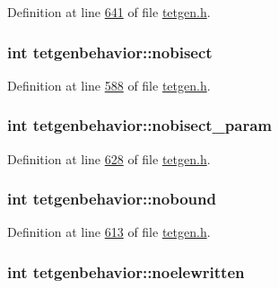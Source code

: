 Definition at line \hyperlink{tetgen_8h_source_l00641}{641} of file \hyperlink{tetgen_8h_source}{tetgen.\+h}.

\subsubsection[{\texorpdfstring{nobisect}{nobisect}}]{\setlength{\rightskip}{0pt plus 5cm}int tetgenbehavior\+::nobisect}\hypertarget{classtetgenbehavior_a14b1ffe9dae2e1849d22739d2ef3ba20}{}\label{classtetgenbehavior_a14b1ffe9dae2e1849d22739d2ef3ba20}


Definition at line \hyperlink{tetgen_8h_source_l00588}{588} of file \hyperlink{tetgen_8h_source}{tetgen.\+h}.

\subsubsection[{\texorpdfstring{nobisect\+\_\+param}{nobisect_param}}]{\setlength{\rightskip}{0pt plus 5cm}int tetgenbehavior\+::nobisect\+\_\+param}\hypertarget{classtetgenbehavior_a6a331aa8b36d3f8dfee8b7fd8102520a}{}\label{classtetgenbehavior_a6a331aa8b36d3f8dfee8b7fd8102520a}


Definition at line \hyperlink{tetgen_8h_source_l00628}{628} of file \hyperlink{tetgen_8h_source}{tetgen.\+h}.

\subsubsection[{\texorpdfstring{nobound}{nobound}}]{\setlength{\rightskip}{0pt plus 5cm}int tetgenbehavior\+::nobound}\hypertarget{classtetgenbehavior_a1e2af153b5b7a271191e021c518f3d83}{}\label{classtetgenbehavior_a1e2af153b5b7a271191e021c518f3d83}


Definition at line \hyperlink{tetgen_8h_source_l00613}{613} of file \hyperlink{tetgen_8h_source}{tetgen.\+h}.

\subsubsection[{\texorpdfstring{noelewritten}{noelewritten}}]{\setlength{\rightskip}{0pt plus 5cm}int tetgenbehavior\+::noelewritten}\hypertarget{classtetgenbehavior_aff425c4d5438943c01a986bde56d163a}{}\label{classtetgenbehavior_aff425c4d5438943c01a986bde56d163a}


